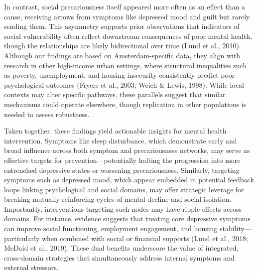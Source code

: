 \documentclass[
]{article}
\begin{document}
In contrast, social precariousness itself appeared more often as an
effect than a cause, receiving arrows from symptoms like depressed mood
and guilt but rarely sending them. This asymmetry supports prior
observations that indicators of social vulnerability often reflect
downstream consequences of poor mental health, though the relationships
are likely bidirectional over time (Lund et al., 2010). Although our
findings are based on Amsterdam-specific data, they align with research
in other high-income urban settings, where structural inequalities such
as poverty, unemployment, and housing insecurity consistently predict
poor psychological outcomes (Fryers et al., 2003; Weich \& Lewis, 1998).
While local contexts may alter specific pathways, these parallels
suggest that similar mechanisms could operate elsewhere, though
replication in other populations is needed to assess robustness.

Taken together, these findings yield actionable insights for mental
health intervention. Symptoms like sleep disturbance, which demonstrate
early and broad influence across both symptom and precariousness
networks, may serve as effective targets for prevention---potentially
halting the progression into more entrenched depressive states or
worsening precariousness. Similarly, targeting symptoms such as
depressed mood, which appear embedded in potential feedback loops
linking psychological and social domains, may offer strategic leverage
for breaking mutually reinforcing cycles of mental decline and social
isolation. Importantly, interventions targeting such nodes may have
ripple effects across domains. For instance, evidence suggests that
treating core depressive symptoms can improve social functioning,
employment engagement, and housing stability---particularly when
combined with social or financial supports (Lund et al., 2018; McDaid et
al., 2019). These dual benefits underscore the value of integrated,
cross-domain strategies that simultaneously address internal symptoms
and external stressors.
\end{document}
